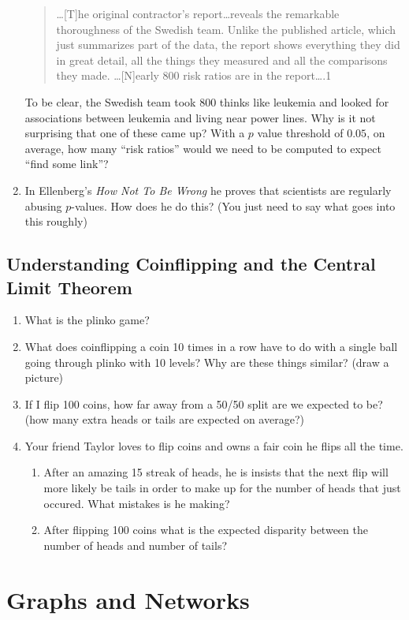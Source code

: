 \documentclass[11pt, letterpaper]{article}
\begin{document}
\begin{enumerate}
\begin{quote}
		…[T]he original contractor's report…reveals the remarkable thoroughness of the Swedish team. Unlike the published article, which just summarizes part of the data, the report shows everything they did in great detail, all the things they measured and all the comparisons they made. …[N]early 800 risk ratios are in the report….1
	\end{quote}
	To be clear, the Swedish team took 800 thinks like leukemia and looked for associations between leukemia and living near power lines. 
	Why is it not surprising that one of these came up?
	With a $p$ value threshold of $0.05$, on average, how many ``risk ratios'' would we need to be computed to expect ``find some link''?
	\item In Ellenberg's \emph{How Not To Be Wrong} he proves that scientists are regularly abusing $p$-values. How does he do this? (You just need to say what goes into this roughly)
\end{enumerate}

\subsection{Understanding Coinflipping and the Central Limit Theorem}
\begin{enumerate}
	\item What is the plinko game? 
	\item What does coinflipping a coin 10 times in a row have to do with a single ball going through plinko with 10 levels? Why are these things similar? (draw a picture)
	\item If I flip 100 coins, how far away from a 50/50 split are we expected to be? (how many extra heads or tails are expected on average?)
	\item Your friend Taylor loves to flip coins and owns a fair coin he flips all the time. 
	\begin{enumerate}
		\item After an amazing 15 streak of heads, he is insists that the next flip will more likely be tails in order to make up for the number of heads that just occured. What mistakes is he making?
		\item After flipping 100 coins what is the expected disparity between the number of heads and number of tails?
	\end{enumerate}
\end{enumerate}

\newpage

\section{Graphs and Networks}
 
\end{document}

